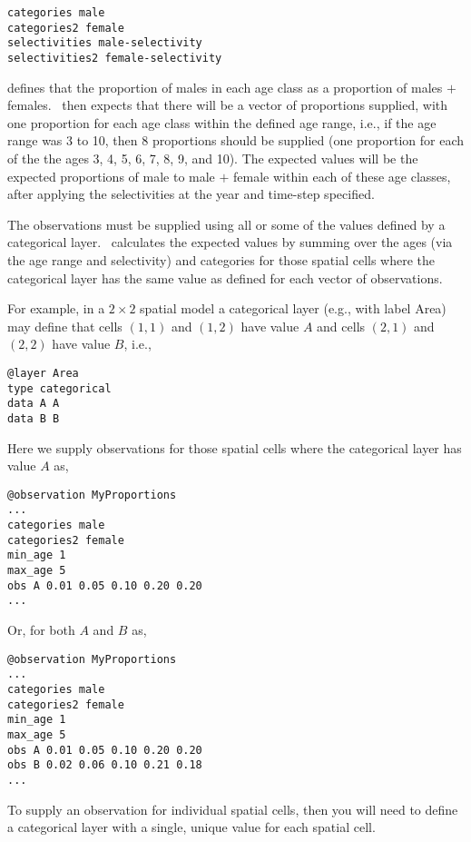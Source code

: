 {{{\small{\begin{verbatim}
categories male
categories2 female
selectivities male-selectivity
selectivities2 female-selectivity
\end{verbatim}}}

defines that the proportion of males in each age class as a proportion of males $+$ females. \SPM\ then expects that there will be a vector of proportions supplied, with one proportion for each age class within the defined age range, i.e., if the age range was 3 to 10, then 8 proportions should be supplied (one proportion for each of the the ages 3, 4, 5, 6, 7, 8, 9, and 10). The expected values will be the expected proportions of male to male $+$ female within each of these age classes, after applying the selectivities at the year and time-step specified. 

The observations must be supplied using all or some of the values defined by a categorical layer. \SPM\ calculates the expected values by summing over the ages (via the age range and selectivity) and categories for those spatial cells where the categorical layer has the same value as defined for each vector of observations.

For example, in a $2 \times 2$ spatial model a categorical layer (e.g., with label Area) may define that cells $(1,1)$ and $(1,2)$ have value $A$ and cells $(2,1)$ and $(2,2)$ have value $B$, i.e.,

{\small{\begin{verbatim}
@layer Area
type categorical
data A A 
data B B
\end{verbatim}}}

Here we supply observations for those spatial cells where the categorical layer has value $A$ as, 

{\small{\begin{verbatim}
@observation MyProportions
...
categories male 
categories2 female
min_age 1
max_age 5
obs A 0.01 0.05 0.10 0.20 0.20
...
\end{verbatim}}}

Or, for both $A$ and $B$ as,

{\small{\begin{verbatim}
@observation MyProportions
...
categories male
categories2 female
min_age 1
max_age 5
obs A 0.01 0.05 0.10 0.20 0.20
obs B 0.02 0.06 0.10 0.21 0.18
...
\end{verbatim}}}

To supply an observation for individual spatial cells, then you will need to define a categorical layer with a single, unique value for each spatial cell. 

}}
